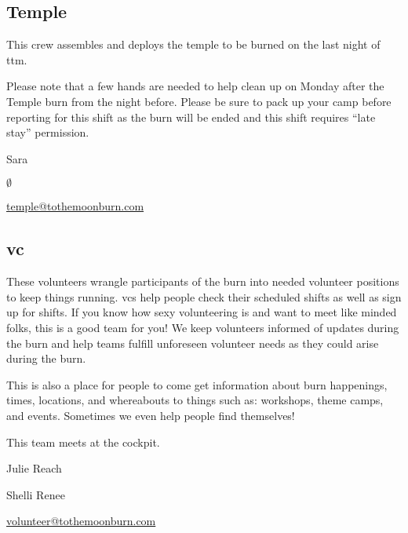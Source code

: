 \subsection*{Temple}
This crew assembles and deploys the \gls{temple} to be burned on the last night of \gls{ttm}.

Please note that a few hands are needed to help clean up on Monday after the Temple burn from the night before. Please be sure to pack up your camp before reporting for this shift as the burn will be ended and this shift requires ``late stay'' permission.

\begin{description}[leftmargin=6em,noitemsep,style=nextline]
   \item[Lead:] Sara
   \item[Co-leads:] $\emptyset$
   \item[Contact:] \url{temple@tothemoonburn.com}
\end{description}


\subsection*{\acrlong{vc}}
These volunteers wrangle participants of the burn into needed volunteer positions to keep things running. \glspl{vc} help people check their scheduled shifts as well as sign up for shifts. If you know how sexy volunteering is and want to meet like minded folks, this is a good team for you! We keep volunteers informed of updates during the burn and help teams fulfill unforeseen volunteer needs as they could arise during the burn.

This is also a place for people to come get information about burn happenings, times, locations, and whereabouts to things such as: workshops, theme camps, and events. Sometimes we even help people find themselves!

This team meets at the \gls{cockpit}.

\begin{description}[leftmargin=6em,noitemsep,style=nextline]
   \item[Lead:] Julie Reach
   \item[Co-leads:] Shelli Renee
   \item[Contact:] \url{volunteer@tothemoonburn.com}
\end{description}